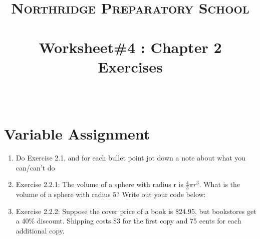 \documentclass[paper=a4, fontsize=11pt]{scrartcl} %
\title{	
\normalfont \normalsize 
\textsc{Northridge Preparatory School} \\ [25pt] %
\horrule{0.5pt} \\[0.4cm] %
\huge Worksheet\#4 : Chapter 2 Exercises \\ %
\horrule{2pt} \\[0.5cm] %
}
\author{} %
\date{} %
\numberwithin{equation}{section} %
\numberwithin{figure}{section} %
\numberwithin{table}{section} %
\begin{document}
\maketitle %


\section{Variable Assignment}


\begin{enumerate}

\item Do Exercise 2.1, and for each bullet point jot down a note about what you can/can't do

\begin{enumerate}
\begin{doublespacing}

\item\rule{12cm}{0.15mm}

\item\rule{12cm}{0.15mm}

\item\rule{12cm}{0.15mm}

\item\rule{12cm}{0.15mm}

\item\rule{12cm}{0.15mm}

\end{doublespacing}
\end{enumerate}

\vspace{1cm}

\item Exercise 2.2.1:  The volume of a sphere with radius r is $\frac{4}{3}\pi r^3$.  What is the volume of a sphere with radius $5$?  Write out your code below:

\begin{framed}

\vspace{1.5in}

\end{framed}

\pagebreak


\item Exercise 2.2.2: Suppose the cover price of a book is \$24.95, but bookstores get a 40\% discount.  Shipping costs \$3 for the first copy and 75 cents for each additional copy.  


\end{enumerate}
\end{document}
